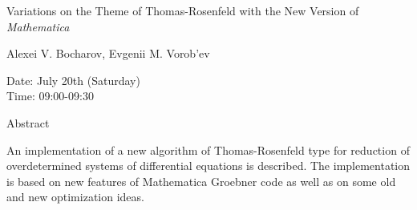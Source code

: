 \begin{center}
\LARGE
Variations on the Theme of Thomas-Rosenfeld with the New
                    Version of {\it Mathematica}

\end{center}

\begin{center}
\Large
Alexei V. Bocharov, Evgenii M. Vorob'ev

\end{center}

\noindent
Date:  July 20th (Saturday)\\
Time:  09:00-09:30\\

\begin{center}
\large
Abstract
\end{center}

An implementation of a new algorithm of Thomas-Rosenfeld type for reduction of
overdetermined systems of differential equations is described. The implementation is based on
new features of Mathematica Groebner code as well as on some old and new optimization ideas. 


